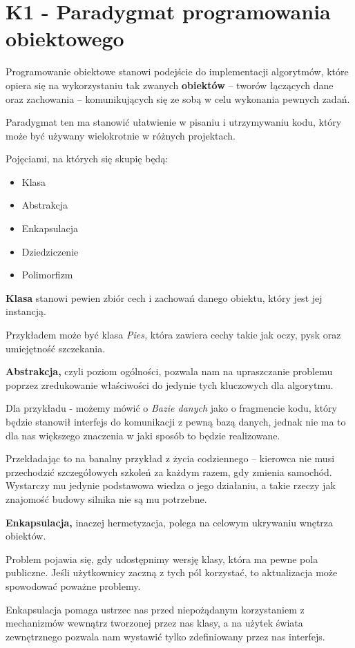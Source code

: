 \section{K1 - Paradygmat programowania obiektowego}

Programowanie obiektowe stanowi podejście do implementacji algorytmów, które opiera się na wykorzystaniu tak zwanych \textbf{obiektów} -- tworów łączących dane oraz zachowania -- komunikujących się ze sobą w celu wykonania pewnych zadań.

Paradygmat ten ma stanowić ułatwienie w pisaniu i utrzymywaniu kodu, który może być używany wielokrotnie w różnych projektach.

Pojęciami, na których się skupię będą:
\begin{itemize}
	\item Klasa
	\item Abstrakcja
	\item Enkapsulacja
	\item Dziedziczenie
	\item Polimorfizm
\end{itemize}

\textbf{Klasa} stanowi pewien zbiór cech i zachowań danego obiektu, który jest jej instancją.

Przykładem może być klasa \textit{Pies,} która zawiera cechy takie jak oczy, pysk oraz umiejętność szczekania.

\textbf{Abstrakcja,} czyli poziom ogólności, pozwala nam na upraszczanie problemu poprzez zredukowanie właściwości do jedynie tych kluczowych dla algorytmu.

Dla przykładu - możemy mówić o \textit{Bazie danych} jako o fragmencie kodu, który będzie stanowił interfejs do komunikacji z pewną bazą danych, jednak nie ma to dla nas większego znaczenia w jaki sposób to będzie realizowane.

Przekładając to na banalny przykład z życia codziennego -- kierowca nie musi przechodzić szczegółowych szkoleń za każdym razem, gdy zmienia samochód.
Wystarczy mu jedynie podstawowa wiedza o jego działaniu, a takie rzeczy jak znajomość budowy silnika nie są mu potrzebne.

\textbf{Enkapsulacja,} inaczej hermetyzacja, polega na celowym ukrywaniu wnętrza obiektów.

Problem pojawia się, gdy udostępnimy wersję klasy, która ma pewne pola publiczne.
Jeśli użytkownicy zaczną z tych pól korzystać, to aktualizacja może spowodować poważne problemy.

Enkapsulacja pomaga ustrzec nas przed niepożądanym korzystaniem z mechanizmów wewnątrz tworzonej przez nas klasy, a na użytek świata zewnętrznego pozwala nam wystawić tylko zdefiniowany przez nas interfejs.


